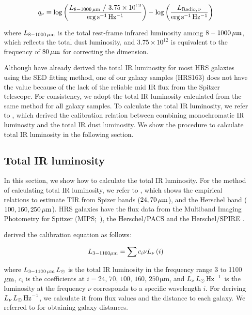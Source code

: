 \begin{equation}\label{eq:q_def}
    q_{\nu} \equiv \log\left(\frac{L_{\mathrm{8-1000\,\mu m}}\ /\ 3.75 \times 10^{12}}{{\rm erg\,s^{-1}\,Hz^{-1}}}\right) - \log\left(\frac{L_{\mathrm{Radio},\,\nu}}{{\rm erg\,s^{-1}\,Hz^{-1}}}\right)
\end{equation}

where $L_{\mathrm{8-1000\,\mu m}}$ is the total rest-frame infrared luminosity among $8 - 1000\,\mathrm{\mu m}$, which reflects the total dust luminosity, and $3.75\times10^{12}$ is equivalent to the frequency of $80\,\mathrm{\mu m}$ for correcting the dimension.

Although \citet{Ciesla2014} have already derived the total IR luminosity for most HRS galaxies using the SED fitting method, one of our galaxy samples (HRS163) does not have the value because of the lack of the reliable mid IR flux from the Spitzer telescope.
For consistency, we adopt the total IR luminosity calculated from the same method for all galaxy samples.
To calculate the total IR luminosity, we refer to \citet{Galametz2013}, which derived the calibration relation between combining monochromatic IR luminosity and the total IR dust luminosity.
We show the procedure to calculate total IR luminosity in the following section.



\subsection{Total IR luminosity}\label{subsec:tirluminosity}
In this section, we show how to calculate the total IR luminosity.
For the method of calculating total IR luminosity, we refer to \citet{Galametz2013}, which shows the empirical relations to estimate TIR from Spizer bands ($24, 70\,\mathrm{\mu m}$), and the Herschel band ($100, 160, 250\,\mathrm{\mu m}$).
HRS galaxies have the flux data from the Multiband Imaging Photometry for Spitzer (MIPS;~\citealt{Rieke2004, Bendo2012}), the Herschel/PACS \citep{Cortese2014c} and the Herschel/SPIRE \citep{Ciesla2012a}.

\citet{Galametz2013} derived the calibration equation as follows:

\begin{equation}\label{eq:galametz}
    L_{\mathrm{3-1100\mathrm{\mu m}}} = \sum c_i \nu L_{\nu}\left(i\right)
\end{equation}

where $L_{\mathrm{3-1100\,\mu m}}\,L_{\odot}$ is the total IR luminosity in the frequency range 3 to 1100 $\mathrm{\mu m}$, $c_i$ is the coefficients at $i = 24,\,70,\,100,\,160,\,250\,\mathrm{\mu m}$, and $L_{\nu}\,L_{\odot}\,{\rm Hz}^{-1}$ is the luminosity at the frequency $\nu$ corresponds to a specific wavelength $i$.
For deriving $L_{\nu}\,L_{\odot}\,{\rm Hz}^{-1}$, we calculate it from flux values and the distance to each galaxy.
We referred to \citet{Cortese2012} for obtaining galaxy distances.

